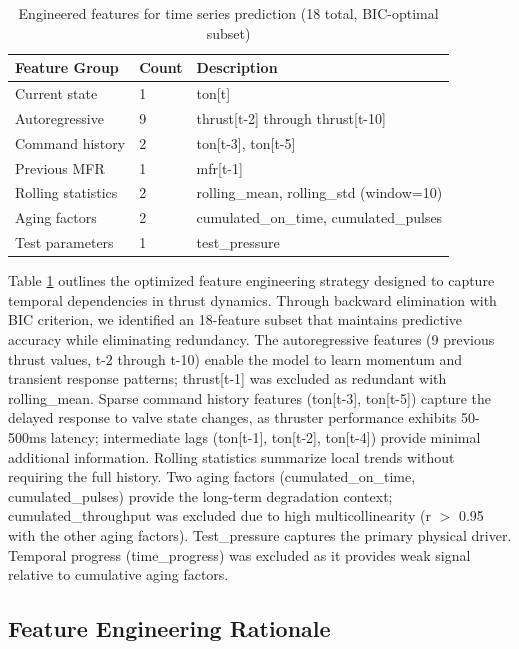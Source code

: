 \documentclass[12pt,a4paper]{article}
\begin{document}
\begin{table}[H]
\centering
\caption{Engineered features for time series prediction (18 total, BIC-optimal subset)}
\label{tab:features}
\small
\begin{tabular}{llp{7cm}}
\toprule
\textbf{Feature Group} & \textbf{Count} & \textbf{Description} \\
\midrule
Current state & 1 & ton[t] \\
Autoregressive & 9 & thrust[t-2] through thrust[t-10] \\
Command history & 2 & ton[t-3], ton[t-5] \\
Previous MFR & 1 & mfr[t-1] \\
Rolling statistics & 2 & rolling\_mean, rolling\_std (window=10) \\
Aging factors & 2 & cumulated\_on\_time, cumulated\_pulses \\
Test parameters & 1 & test\_pressure \\
\bottomrule
\end{tabular}
\end{table}

Table \ref{tab:features} outlines the optimized feature engineering strategy designed to capture temporal dependencies in thrust dynamics. Through backward elimination with BIC criterion, we identified an 18-feature subset that maintains predictive accuracy while eliminating redundancy. The autoregressive features (9 previous thrust values, t-2 through t-10) enable the model to learn momentum and transient response patterns; thrust[t-1] was excluded as redundant with rolling\_mean. Sparse command history features (ton[t-3], ton[t-5]) capture the delayed response to valve state changes, as thruster performance exhibits 50-500ms latency; intermediate lags (ton[t-1], ton[t-2], ton[t-4]) provide minimal additional information. Rolling statistics summarize local trends without requiring the full history. Two aging factors (cumulated\_on\_time, cumulated\_pulses) provide the long-term degradation context; cumulated\_throughput was excluded due to high multicollinearity (r $>$ 0.95 with the other aging factors). Test\_pressure captures the primary physical driver. Temporal progress (time\_progress) was excluded as it provides weak signal relative to cumulative aging factors.

\subsection{Feature Engineering Rationale}
\end{document}
